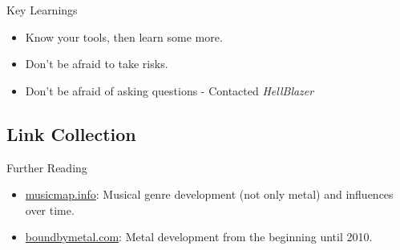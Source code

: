 \documentclass{beamer}
\begin{document}
    \begin{frame}{Key Learnings}

      \begin{itemize}
        \item<1-> Know your tools, then learn some more.
        \item<1-> Don't be afraid to take risks.
        \item<2-> Don't be afraid of asking questions - Contacted \textit{HellBlazer}
      \end{itemize}

    \end{frame}
    
  \subsection{Link Collection}

    \begin{frame}{Further Reading}
      \begin{itemize}
        \item\href{https://musicmap.info/}{musicmap.info}: Musical genre development
          (not only metal) and influences over time.
        \item\href{https://www.boundbymetal.com/en/common/metal-genres-graph/}
          {boundbymetal.com}: Metal
          development from the beginning until 2010.
      \end{itemize}
    \end{frame}
\end{document}
